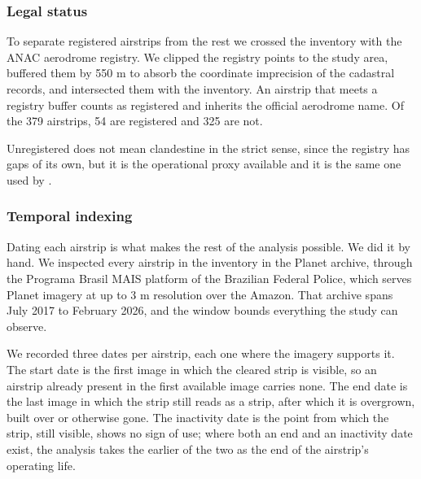 \documentclass[11pt]{article}
\begin{document}

\subsubsection{Legal status}

To separate registered airstrips from the rest we crossed the inventory with the ANAC aerodrome registry. We clipped the registry points to the study area, buffered them by 550 m to absorb the coordinate imprecision of the cadastral records, and intersected them with the inventory. An airstrip that meets a registry buffer counts as registered and inherits the official aerodrome name. Of the 379 airstrips, 54 are registered and 325 are not.

Unregistered does not mean clandestine in the strict sense, since the registry has gaps of its own, but it is the operational proxy available and it is the same one used by \citet{intercept2022}.

\subsubsection{Temporal indexing}
\label{sec:index}

Dating each airstrip is what makes the rest of the analysis possible. We did it by hand. We inspected every airstrip in the inventory in the Planet archive, through the Programa Brasil MAIS platform of the Brazilian Federal Police, which serves Planet imagery at up to 3 m resolution over the Amazon. That archive spans July 2017 to February 2026, and the window bounds everything the study can observe.

We recorded three dates per airstrip, each one where the imagery supports it. The start date is the first image in which the cleared strip is visible, so an airstrip already present in the first available image carries none. The end date is the last image in which the strip still reads as a strip, after which it is overgrown, built over or otherwise gone. The inactivity date is the point from which the strip, still visible, shows no sign of use; where both an end and an inactivity date exist, the analysis takes the earlier of the two as the end of the airstrip's operating life.

\end{document}
